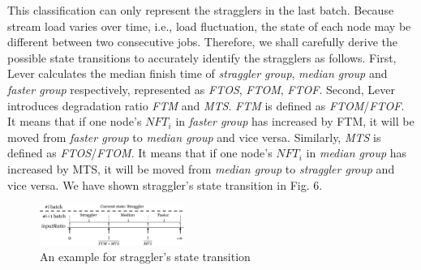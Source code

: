   This classification can only represent the stragglers in the last batch. Because stream load varies over time, i.e., load fluctuation, the state of each node may be different between two consecutive jobs. Therefore, we shall carefully derive the possible state transitions to accurately identify the stragglers as follows. First, Lever calculates the median finish time of \emph{straggler group}, \emph{median group} and \emph{faster group} respectively, represented as \emph{FTOS}, \emph{FTOM}, \emph{FTOF}. Second, Lever introduces degradation ratio \emph{FTM} and \emph{MTS}. \emph{FTM} is defined as \emph{FTOM}/\emph{FTOF}. It means that if one node's $NFT_i$ in \emph{faster group} has increased by FTM, it will be moved from \emph{faster group} to \emph{median group} and vice versa. Similarly, \emph{MTS} is defined as \emph{FTOS}/\emph{FTOM}. It means that if one node's $NFT_i$ in \emph{median group} has increased by MTS, it will be moved from \emph{median group} to \emph{straggler group} and vice versa. We have shown straggler's state transition in Fig. 6.
  \begin{figure}[htbp]
    \centering
    \includegraphics[width=0.42\textwidth]{FigureI2}
    \caption{An example for straggler's state transition}
    \label{Fig. 6:}
  \end{figure}

